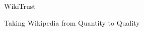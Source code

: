 \vspace*{\fill}
\begin{center}
\HUGE\textsf{WikiTrust}\par
\end{center}
\begin{center}
\LARGE\textsf{Taking Wikipedia from Quantity to Quality}\par
\end{center}
\vspace*{\fill}
